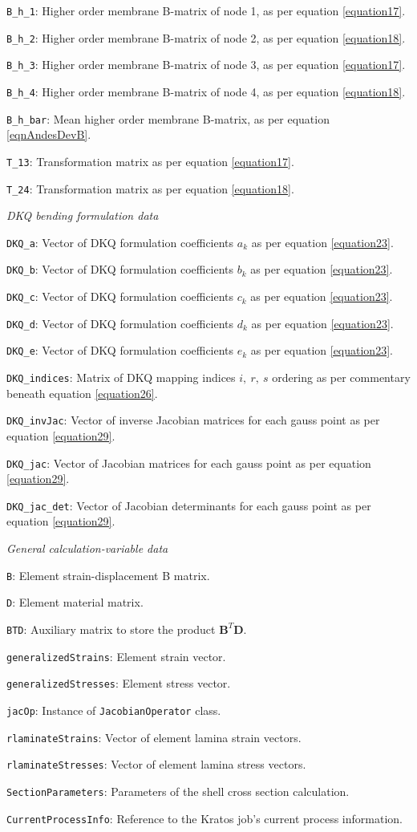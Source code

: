 \texttt{B\_h\_1}: Higher order membrane B-matrix of node 1, as per equation \ref{equation17}.

\texttt{B\_h\_2}: Higher order membrane B-matrix of node 2, as per equation \ref{equation18}.

\texttt{B\_h\_3}: Higher order membrane B-matrix of node 3, as per equation \ref{equation17}.

\texttt{B\_h\_4}: Higher order membrane B-matrix of node 4, as per equation \ref{equation18}.

\texttt{B\_h\_bar}: Mean higher order membrane B-matrix, as per equation \ref{eqnAndesDevB}.

\texttt{T\_13}: Transformation matrix as per equation \ref{equation17}.

\texttt{T\_24}: Transformation matrix as per equation \ref{equation18}.

\textit{DKQ bending formulation data}

\texttt{DKQ\_a}: Vector of DKQ formulation coefficients $a_k$ as per equation \ref{equation23}.

\texttt{DKQ\_b}: Vector of DKQ formulation coefficients $b_k$ as per equation \ref{equation23}.

\texttt{DKQ\_c}: Vector of DKQ formulation coefficients $c_k$ as per equation \ref{equation23}.

\texttt{DKQ\_d}: Vector of DKQ formulation coefficients $d_k$ as per equation \ref{equation23}.

\texttt{DKQ\_e}: Vector of DKQ formulation coefficients $e_k$ as per equation \ref{equation23}.

\texttt{DKQ\_indices}: Matrix of DKQ mapping indices $i,\ r,\ s$ ordering as per commentary beneath equation \ref{equation26}.

\texttt{DKQ\_invJac}: Vector of inverse Jacobian matrices for each gauss point as per equation \ref{equation29}.

\texttt{DKQ\_jac}: Vector of Jacobian matrices for each gauss point as per equation \ref{equation29}.

\texttt{DKQ\_jac\_det}: Vector of Jacobian determinants for each gauss point as per equation \ref{equation29}.

\textit{General calculation-variable data}

\texttt{B}: Element strain-displacement B matrix.

\texttt{D}: Element material matrix.	

\texttt{BTD}: Auxiliary matrix to store the product $\mathbf{B}^T \mathbf{D}$.	

\texttt{generalizedStrains}: Element strain vector.

\texttt{generalizedStresses}: Element stress vector.

\texttt{jacOp}: Instance of \texttt{JacobianOperator} class.

\texttt{rlaminateStrains}: Vector of element lamina strain vectors.

\texttt{rlaminateStresses}: Vector of element lamina stress vectors.

\texttt{SectionParameters}: Parameters of the shell cross section calculation.

\texttt{CurrentProcessInfo}: Reference to the Kratos job's current process information.